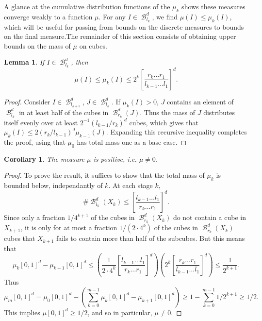 \documentclass[dvipsnames,letterpaper,12pt]{article}
\theoremstyle{plain}
\newtheorem{lemma}{Lemma}
\newtheorem{corollary}{Corollary}
\DeclareMathOperator{\B}{\mathcal{B}}
\begin{document}
A glance at the cumulative distribution functions of the $\mu_k$ shows these measures converge weakly to a function $\mu$. For any $I \in \B^d_{l_k}$, we find $\mu(I) \leq \mu_k(I)$, which will be useful for passing from bounds on the discrete measures to bounds on the final measure.The remainder of this section consists of obtaining upper bounds on the mass of $\mu$ on cubes.

\begin{lemma}
	If $I \in \B^d_{l_k}$, then
	\begin{equation} \label{mubound}
		\mu(I) \leq \mu_k(I) \leq 2^k \left[ \frac{r_k \dots r_1}{l_{k-1} \dots l_1} \right]^d.
	\end{equation}
\end{lemma}
\begin{proof}
	Consider $I \in \B^d_{l_{k+1}}$, $J \in \B^d_{l_k}$. If $\mu_k(I) > 0$, $J$ contains an element of $\B^d_{l_k}$ in at least half of the cubes in $\B^d_{r_k}(J)$. Thus the mass of $J$ distributes itself evenly over at least $2^{-1}(l_{k-1}/r_k)^d$ cubes, which gives that $\mu_k(I) \leq 2(r_k/l_{k-1})^d \mu_{k-1}(J)$. Expanding this recursive inequality completes the proof, using that $\mu_0$ has total mass one as a base case.
\end{proof}

\begin{corollary}
	The measure $\mu$ is positive, i.e. $\mu \neq 0$.
\end{corollary}
\begin{proof}
	To prove the result, it suffices to show that the total mass of $\mu_k$ is bounded below, independantly of $k$. At each stage $k$,
	\[ \# \B^d_{l_k}(X_k) \leq \left[ \frac{l_{k-1} \dots l_1}{r_k \dots r_1} \right]^d. \]
	Since only a fraction $1/4^{k+1}$ of the cubes in $\B^d_{r_k}(X_k)$ do not contain a cube in $X_{k+1}$, it is only for at most a fraction $1/(2 \cdot 4^k)$ of the cubes in $\B^d_{r_k}(X_k)$ cubes that $X_{k+1}$ fails to contain more than half of the subcubes. But this means that
	\[ \mu_k[0,1]^d - \mu_{k+1}[0,1]^d \leq \left( \frac{1}{2 \cdot 4^k} \left[ \frac{l_{k-1} \dots l_1}{r_k \dots r_1} \right]^d \right) \left( 2^k \left[ \frac{r_k \dots r_1}{l_{k-1} \dots l_1} \right]^d \right) \leq \frac{1}{2^{k+1}}. \]
	Thus
	\[ \mu_m[0,1]^d = \mu_0[0,1]^d - \left( \sum_{k = 0}^{m-1} \mu_k[0,1]^d - \mu_{k+1}[0,1]^d \right) \geq 1 - \sum_{k = 0}^{m-1} 1/2^{k+1} \geq 1/2. \]
	This implies $\mu[0,1]^d \geq 1/2$, and so in particular, $\mu \neq 0$.
\end{proof}
\end{document}
